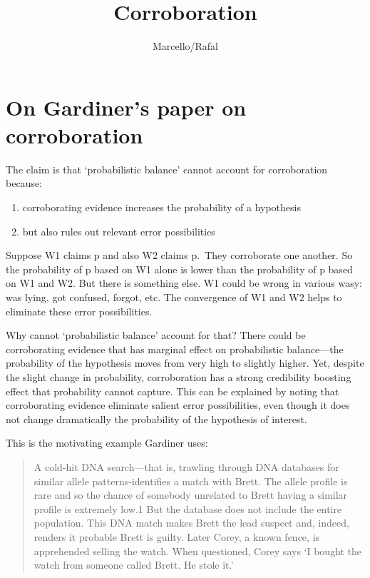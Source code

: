 \documentclass[
  11pt,
  dvipsnames,enabledeprecatedfontcommands]{scrartcl}
\title{Corroboration}
\author{Marcello/Rafal}
\date{}
\begin{document}
\maketitle

\hypertarget{on-gardiners-paper-on-corroboration}{%
\section{On Gardiner's paper on
corroboration}\label{on-gardiners-paper-on-corroboration}}

The claim is that `probabilistic balance' cannot account for
corroboration because:

\begin{enumerate}
\def\labelenumi{\arabic{enumi}.}
\item
  corroborating evidence increases the probability of a hypothesis
\item
  but also rules out relevant error possibilities
\end{enumerate}

Suppose W1 claims p and also W2 claims p.~They corroborate one another.
So the probability of p based on W1 alone is lower than the probability
of p based on W1 and W2. But there is something else. W1 could be wrong
in various wasy: was lying, got confused, forgot, etc. The convergence
of W1 and W2 helps to eliminate these error possibilities.

Why cannot `probabilistic balance' account for that? There could be
corroborating evidence that has marginal effect on probabilistic
balance---the probability of the hypothesis moves from very high to
slightly higher. Yet, despite the slight change in probability,
corroboration has a strong credibility boosting effect that probability
cannot capture. This can be explained by noting that corroborating
evidence eliminate salient error possibilities, even though it does not
change dramatically the probability of the hypothesis of interest.

This is the motivating example Gardiner uses:

\begin{quote}
A cold-hit DNA search---that is, trawling through DNA databases for
similar allele patterns-identifies a match with Brett. The allele
profile is rare and so the chance of somebody unrelated to Brett having
a similar profile is extremely low.1 But the database does not include
the entire population. This DNA match makes Brett the lead suspect and,
indeed, renders it probable Brett is guilty. Later Corey, a known fence,
is apprehended selling the watch. When questioned, Corey says `I bought
the watch from someone called Brett. He stole it.'
\end{quote}
\end{document}
